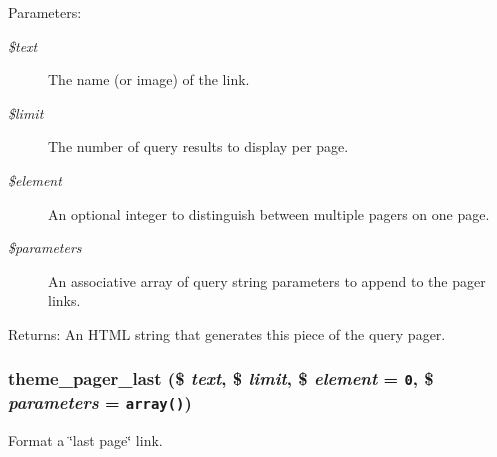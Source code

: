 \begin{Desc}
\item[Parameters:]
\begin{description}
\item[{\em \$text}]The name (or image) of the link. \item[{\em \$limit}]The number of query results to display per page. \item[{\em \$element}]An optional integer to distinguish between multiple pagers on one page. \item[{\em \$parameters}]An associative array of query string parameters to append to the pager links. \end{description}
\end{Desc}
\begin{Desc}
\item[Returns:]An HTML string that generates this piece of the query pager. \end{Desc}
\hypertarget{group__themeable_g311db2dbb5acbda9d0938f28f161c9a8}{
\subsubsection[{theme\_\-pager\_\-last}]{\setlength{\rightskip}{0pt plus 5cm}theme\_\-pager\_\-last (\$ {\em text}, \/  \$ {\em limit}, \/  \$ {\em element} = {\tt 0}, \/  \$ {\em parameters} = {\tt array()})}}
\label{group__themeable_g311db2dbb5acbda9d0938f28f161c9a8}


Format a \char`\"{}last page\char`\"{} link.


